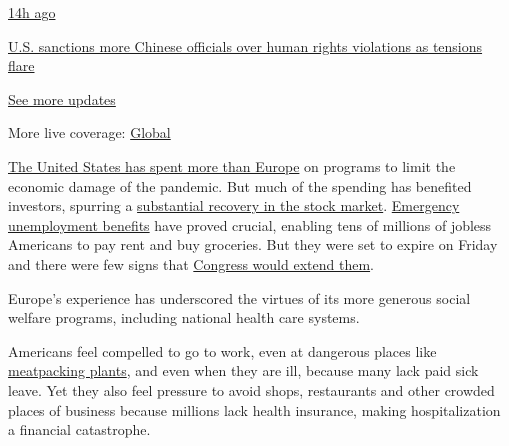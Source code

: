\href{https://www.nytimes3xbfgragh.onion/live/2020/07/31/business/stock-market-today-coronavirus?action=click\&pgtype=Article\&state=default\&region=MAIN_CONTENT_1\&context=storylines_live_updates\#us-sanctions-more-chinese-officials-over-human-rights-violations-as-tensions-flare}{14h
ago}

\href{https://www.nytimes3xbfgragh.onion/live/2020/07/31/business/stock-market-today-coronavirus?action=click\&pgtype=Article\&state=default\&region=MAIN_CONTENT_1\&context=storylines_live_updates\#us-sanctions-more-chinese-officials-over-human-rights-violations-as-tensions-flare}{U.S.
sanctions more Chinese officials over human rights violations as
tensions flare}

\href{https://www.nytimes3xbfgragh.onion/live/2020/07/31/business/stock-market-today-coronavirus?action=click\&pgtype=Article\&state=default\&region=MAIN_CONTENT_1\&context=storylines_live_updates}{See
more updates}

More live coverage:
\href{https://www.nytimes3xbfgragh.onion/2020/07/31/world/coronavirus-covid-19.html?action=click\&pgtype=Article\&state=default\&region=MAIN_CONTENT_1\&context=storylines_live_updates}{Global}

\href{https://www.bruegel.org/publications/datasets/covid-national-dataset/}{The
United States has spent more than Europe} on programs to limit the
economic damage of the pandemic. But much of the spending has benefited
investors, spurring a
\href{https://www.nytimes3xbfgragh.onion/2020/06/08/business/recession-stock-market-coronavirus.html}{substantial
recovery in the stock market}.
\href{https://www.nytimes3xbfgragh.onion/2020/07/29/business/economy/unemployment-benefits-coronavirus.html}{Emergency
unemployment benefits} have proved crucial, enabling tens of millions of
jobless Americans to pay rent and buy groceries. But they were set to
expire on Friday and there were few signs that
\href{https://www.nytimes3xbfgragh.onion/2020/07/30/us/politics/senate-virus-aid.html}{Congress
would extend them}.

Europe's experience has underscored the virtues of its more generous
social welfare programs, including national health care systems.

Americans feel compelled to go to work, even at dangerous places like
\href{https://www.nytimes3xbfgragh.onion/2020/05/10/business/economy/coronavirus-tyson-plant-iowa.html}{meatpacking
plants}, and even when they are ill, because many lack paid sick leave.
Yet they also feel pressure to avoid shops, restaurants and other
crowded places of business because millions lack health insurance,
making hospitalization a financial catastrophe.

